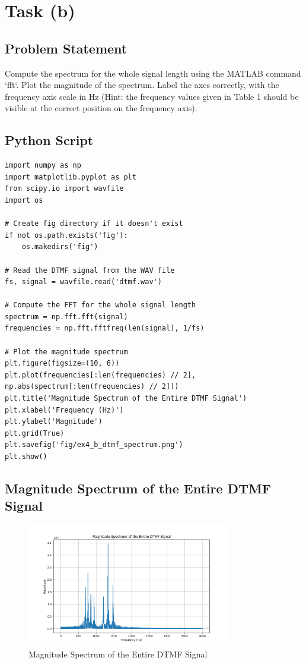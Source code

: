 \item[(b)]
\section*{Task (b)}

\subsection*{Problem Statement}
Compute the spectrum for the whole signal length using the MATLAB command `fft`. Plot the magnitude of the spectrum. Label the axes correctly, with the frequency axis scale in Hz (Hint: the frequency values given in Table 1 should be visible at the correct position on the frequency axis).

\subsection*{Python Script}
\begin{verbatim}
import numpy as np
import matplotlib.pyplot as plt
from scipy.io import wavfile
import os

# Create fig directory if it doesn't exist
if not os.path.exists('fig'):
    os.makedirs('fig')

# Read the DTMF signal from the WAV file
fs, signal = wavfile.read('dtmf.wav')

# Compute the FFT for the whole signal length
spectrum = np.fft.fft(signal)
frequencies = np.fft.fftfreq(len(signal), 1/fs)

# Plot the magnitude spectrum
plt.figure(figsize=(10, 6))
plt.plot(frequencies[:len(frequencies) // 2], np.abs(spectrum[:len(frequencies) // 2]))
plt.title('Magnitude Spectrum of the Entire DTMF Signal')
plt.xlabel('Frequency (Hz)')
plt.ylabel('Magnitude')
plt.grid(True)
plt.savefig('fig/ex4_b_dtmf_spectrum.png')
plt.show()
\end{verbatim}

\subsection*{Magnitude Spectrum of the Entire DTMF Signal}
\begin{figure}[h]
    \centering
    \includegraphics[width=0.8\textwidth]{fig/ex4_b_dtmf_spectrum.png}
    \caption{Magnitude Spectrum of the Entire DTMF Signal}
    \label{fig:ex4_b_dtmf_spectrum}
\end{figure}

